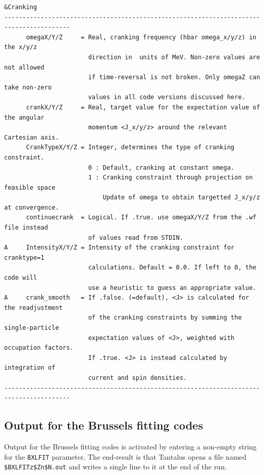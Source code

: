 \documentclass[print,amsmath,amssymb,aps,prc,nofootinbib,notitlepage]{revtex4-1}
\begin{document}
\begin{Verbatim}
&Cranking
----------------------------------------------------------------------------------------
      omegaX/Y/Z     = Real, cranking frequency (hbar omega_x/y/z) in the x/y/z
                       direction in  units of MeV. Non-zero values are not allowed
                       if time-reversal is not broken. Only omegaZ can take non-zero 
                       values in all code versions discussed here. 
      crankX/Y/Z     = Real, target value for the expectation value of the angular 
                       momentum <J_x/y/z> around the relevant Cartesian axis.
      CrankTypeX/Y/Z = Integer, determines the type of cranking constraint.
                       0 : Default, cranking at constant omega.   
                       1 : Cranking constraint through projection on feasible space
                           Update of omega to obtain targetted J_x/y/z at convergence.                           
      continuecrank  = Logical. If .true. use omegaX/Y/Z from the .wf file instead
                       of values read from STDIN.
A     IntensityX/Y/Z = Intensity of the cranking constraint for cranktype=1
                       calculations. Default = 0.0. If left to 0, the code will
                       use a heuristic to guess an appropriate value.
A     crank_smooth   = If .false. (=default), <J> is calculated for the readjustment 
                       of the cranking constraints by summing the single-particle 
                       expectation values of <J>, weighted with occupation factors. 
                       If .true. <J> is instead calculated by integration of 
                       current and spin densities.
----------------------------------------------------------------------------------------
\end{Verbatim}


\clearpage

\subsection{Output for the Brussels fitting codes}

Output for the Brussels fitting codes is activated by entering a non-empty string
for the \texttt{BXLFIT} parameter. The end-result is that Tantalus opens a file
named \texttt{\${BXLFIT}z\${Z}n\${N}.out} and writes a single line to it at the end of the run. 
\end{document}
